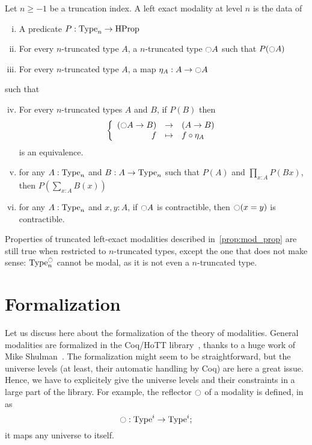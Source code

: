 \begin{defi}
  \label{def:tr_mod}
  Let $n\geq -1$ be a truncation index. A left exact modality at level
  $n$ is the data of
  \begin{enumerate}[(i)]
  \item A predicate $P:\operatorname{Type}_n \to \operatorname{HProp}$
  \item For every $n$-truncated type $A$, a $n$-truncated type
    $\ocircle A$ such that $P(\ocircle A)$
  \item For every $n$-truncated type $A$, a map $\eta_A:A \to
    \ocircle A$
  \end{enumerate}
  such that
  \begin{enumerate}[(i)]
    \setcounter{enumi}{3}
  \item For every $n$-truncated types $A$ and $B$, if $P(B)$ then
    \[\left\{
      \begin{array}{rcl}
        (\ocircle A \to B) & \to & (A \to B) \\
        f & \mapsto & f \circ \eta_A
      \end{array} \right.\]
    is an equivalence.
  \item for any $A:\operatorname{Type}_n$ and $B:A \to \operatorname{Type}_n$ such that $P(A)$
    and $\prod_{x:A} P(B x)$, then $P\left( \sum_{x:A} B(x)\right)$
  \item for any $A:\operatorname{Type}_n$ and $x,y:A$, if $\ocircle A$ is
    contractible, then $\ocircle (x=y)$ is contractible.
  \end{enumerate}
\end{defi}

Properties of truncated left-exact modalities described
in~\ref{prop:mod_prop} are still true when restricted to $n$-truncated
types, except the one that does not make sense: $\operatorname{Type}_n^{\ocircle}$
cannot be modal, as it is not even a $n$-truncated type.

\section{Formalization}
\label{sec:mod-formalization}

Let us discuss here about the formalization of the theory of
modalities. General modalities are formalized in the Coq/HoTT
library~\cite{hottlib}, thanks to a huge work of Mike
Shulman~\cite{modules-modalities}. The formalization might seem to be
straightforward, but the universe levels (at least, their automatic
handling by Coq) are here a great issue. Hence, we have to explicitely
give the universe levels and their constraints in a large part of the
library. For example, the reflector $\ocircle$ of a modality is defined,
in~\cite{hottlib} as
\[ \ocircle : \operatorname{Type}^i \to \operatorname{Type}^i ;\]
it maps any universe to itself.

